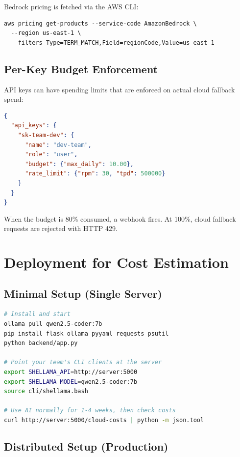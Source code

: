 \documentclass[11pt,a4paper]{article}
\begin{document}
Bedrock pricing is fetched via the AWS CLI:

\begin{lstlisting}[caption={AWS Pricing API call}]
aws pricing get-products --service-code AmazonBedrock \
  --region us-east-1 \
  --filters Type=TERM_MATCH,Field=regionCode,Value=us-east-1
\end{lstlisting}

\subsection{Per-Key Budget Enforcement}

API keys can have spending limits that are enforced on actual cloud fallback spend:

\begin{lstlisting}[language=json,caption={API key with budget limit}]
{
  "api_keys": {
    "sk-team-dev": {
      "name": "dev-team",
      "role": "user",
      "budget": {"max_daily": 10.00},
      "rate_limit": {"rpm": 30, "tpd": 500000}
    }
  }
}
\end{lstlisting}

When the budget is 80\% consumed, a webhook fires. At 100\%, cloud fallback requests are rejected with HTTP 429.

\section{Deployment for Cost Estimation}

\subsection{Minimal Setup (Single Server)}

\begin{lstlisting}[language=bash,caption={Quick start for cost estimation}]
# Install and start
ollama pull qwen2.5-coder:7b
pip install flask ollama pyyaml requests psutil
python backend/app.py

# Point your team's CLI clients at the server
export SHELLAMA_API=http://server:5000
export SHELLAMA_MODEL=qwen2.5-coder:7b
source cli/shellama.bash

# Use AI normally for 1-4 weeks, then check costs
curl http://server:5000/cloud-costs | python -m json.tool
\end{lstlisting}

\subsection{Distributed Setup (Production)}
\end{document}
